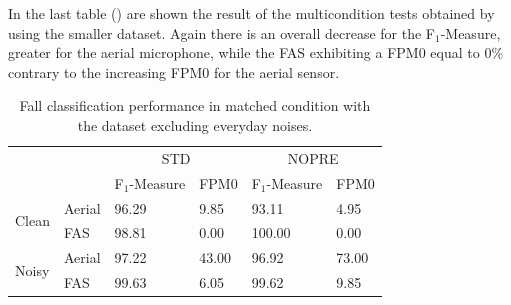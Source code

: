 In the last table () are shown the result of the multicondition tests obtained by using the smaller dataset. Again there is an overall decrease for the F$_1$-Measure, greater for the aerial microphone, while the FAS exhibiting a FPM0 equal to 0\% contrary to the increasing FPM0 for the aerial sensor.
\begin{table}[t]
	\centering
	\caption{Fall classification performance in matched condition with the dataset excluding everyday noises.}\label{tab:match_lolo44}
	\begin{tabularx}{\textwidth}{ | X  X | X X | X  X | }
		\hline
		&			&\multicolumn{2}{c|}{STD} 	&\multicolumn{2}{c|}{NOPRE}  \\
		&		  	& F$_1$-Measure 		& FPM0 			& F$_1$-Measure & FPM0   \\ \hline
		\multirow{ 2}{*}{Clean} & Aerial  	& 96.29 		 		& 9.85			& 93.11 		 & 4.95	  		\\
		& FAS 	 	& 98.81 		 		& 0.00	  		& 100.00   	 	 & 0.00	   \\ \hline
		\multirow{ 2}{*}{Noisy} & Aerial 	& 97.22 		 		& 43.00   		& 96.92 		 & 73.00  	  \\
		& FAS	 	& 99.63			 		& 6.05   		& 99.62 		 & 9.85  	  \\ \hline
	\end{tabularx}

\end{table} 


